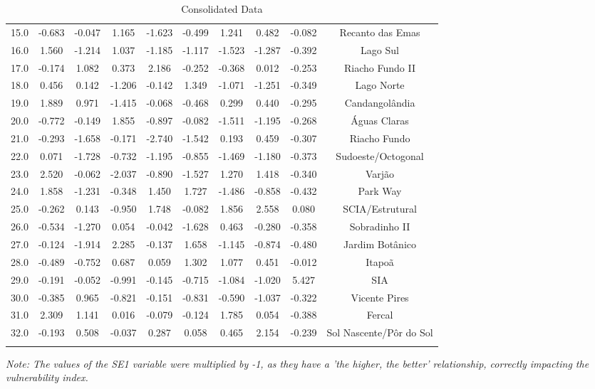 \documentclass[conference]{IEEEtran}
\begin{document}
\begin{longtable}{|c|c|c|c|c|c|c|c|c|c|}
15.0 & -0.683 & -0.047 &  1.165 & -1.623 & -0.499 &  1.241 &  0.482 & -0.082 &         Recanto das Emas \\
16.0 &  1.560 & -1.214 &  1.037 & -1.185 & -1.117 & -1.523 & -1.287 & -0.392 &                 Lago Sul \\
17.0 & -0.174 &  1.082 &  0.373 &  2.186 & -0.252 & -0.368 &  0.012 & -0.253 &          Riacho Fundo II \\
18.0 &  0.456 &  0.142 & -1.206 & -0.142 &  1.349 & -1.071 & -1.251 & -0.349 &               Lago Norte \\
19.0 &  1.889 &  0.971 & -1.415 & -0.068 & -0.468 &  0.299 &  0.440 & -0.295 &           Candangolândia \\
20.0 & -0.772 & -0.149 &  1.855 & -0.897 & -0.082 & -1.511 & -1.195 & -0.268 &             Águas Claras \\
21.0 & -0.293 & -1.658 & -0.171 & -2.740 & -1.542 &  0.193 &  0.459 & -0.307 &             Riacho Fundo \\
22.0 &  0.071 & -1.728 & -0.732 & -1.195 & -0.855 & -1.469 & -1.180 & -0.373 &       Sudoeste/Octogonal \\
23.0 &  2.520 & -0.062 & -2.037 & -0.890 & -1.527 &  1.270 &  1.418 & -0.340 &                   Varjão \\
24.0 &  1.858 & -1.231 & -0.348 &  1.450 &  1.727 & -1.486 & -0.858 & -0.432 &                 Park Way \\
25.0 & -0.262 &  0.143 & -0.950 &  1.748 & -0.082 &  1.856 &  2.558 &  0.080 &          SCIA/Estrutural \\
26.0 & -0.534 & -1.270 &  0.054 & -0.042 & -1.628 &  0.463 & -0.280 & -0.358 &            Sobradinho II \\
27.0 & -0.124 & -1.914 &  2.285 & -0.137 &  1.658 & -1.145 & -0.874 & -0.480 &          Jardim Botânico \\
28.0 & -0.489 & -0.752 &  0.687 &  0.059 &  1.302 &  1.077 &  0.451 & -0.012 &                   Itapoã \\
29.0 & -0.191 & -0.052 & -0.991 & -0.145 & -0.715 & -1.084 & -1.020 &  5.427 &                      SIA \\
30.0 & -0.385 &  0.965 & -0.821 & -0.151 & -0.831 & -0.590 & -1.037 & -0.322 &            Vicente Pires \\
31.0 &  2.309 &  1.141 &  0.016 & -0.079 & -0.124 &  1.785 &  0.054 & -0.388 &                   Fercal \\
32.0 & -0.193 &  0.508 & -0.037 &  0.287 &  0.058 &  0.465 &  2.154 & -0.239 &  Sol Nascente/Pôr do Sol \\
\hline
\caption{Consolidated Data} \\
\end{longtable}

\textit{Note: The values of the SE1 variable were multiplied by -1, as they have a 'the higher, the better' relationship, correctly impacting the vulnerability index.}
\end{document}
